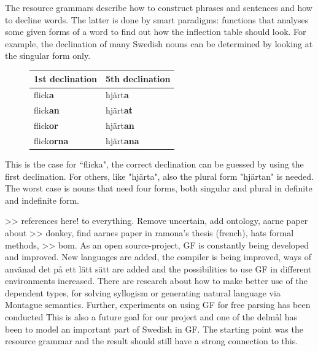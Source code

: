 \documentclass{report}
\begin{document}
The resource grammars describe how to construct phrases and sentences and how to
decline words. The latter is done by smart paradigms: functions that analyses
some given forms of a word to find out how the inflection table should look.
For example, the declination of many Swedish nouns can be determined by looking
at the singular form only. 
\begin{figure}
\begin{tabular}{| l | l |}
\hline
1st declination & 5th declination \\
\hline
flick\textbf{a}    &     hjärt\textbf{a}   \\
flick\textbf{an}    &    hjärt\textbf{at}  \\
flick\textbf{or}    &    hjärt\textbf{an}  \\
flick\textbf{orna}  &    hjärt\textbf{ana} \\
\hline
\end{tabular}
\end{figure}
This is the case for ``flicka", the correct declination
can be guessed by using the first declination. %
For others, like "hjärta", also the plural form "hjärtan" is needed.
The worst case is nouns that need four forms, both singular and
plural in definite and indefinite form.


\vspace{5mm}
>> references here! to everything. Remove uncertain, add ontology, aarne paper about
>> donkey, find aarnes paper in ramona's thesis (french), hats formal methods,
>> bom.
As an open source-project, GF is constantly being developed and improved. New
languages are added, the compiler is being improved, ways of använad det på ett
lätt sätt are added and the possibilities to use GF in different environments
increased. There are  research about how to make better use of the dependent
types, for solving syllogism or generating natural language via Montague
semantics\cite{montague}.
Further, experiments on using GF for free parsing has been conducted
\cite[]{gfMech} 
This is also a future goal for our project and one of the delmål has been to
model an important part of Swedish in GF. The starting point was the resource
grammar and the result should still have a strong connection to this.
\end{document}
